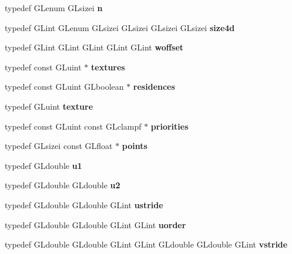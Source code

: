 \begin{DoxyCompactItemize}
\item 
typedef G\+Lenum G\+Lsizei {\bfseries n}\label{_s_d_l__opengl_8h_a0788d3762d0c3c76e4c094d8078b4c27}

\item 
typedef G\+Lint G\+Lenum G\+Lsizei G\+Lsizei G\+Lsizei G\+Lsizei {\bfseries size4d}\label{_s_d_l__opengl_8h_a3ee638722d778306b1776526a7711d9a}

\item 
typedef G\+Lint G\+Lint G\+Lint G\+Lint G\+Lint {\bfseries woffset}\label{_s_d_l__opengl_8h_ad57a355b89bd6780d0797d5a72d15514}

\item 
typedef const G\+Luint $\ast$ {\bfseries textures}\label{_s_d_l__opengl_8h_a450062c0770127a605331b58382bfa3b}

\item 
typedef const G\+Luint G\+Lboolean $\ast$ {\bfseries residences}\label{_s_d_l__opengl_8h_a1b73b6faf5e03196654860a3c89c8265}

\item 
typedef G\+Luint {\bfseries texture}\label{_s_d_l__opengl_8h_a8f486379aef534669f4f06f515e7ce6c}

\item 
typedef const G\+Luint const G\+Lclampf $\ast$ {\bfseries priorities}\label{_s_d_l__opengl_8h_ab2d88f127452baef8666791f74e9a794}

\item 
typedef G\+Lsizei const G\+Lfloat $\ast$ {\bfseries points}\label{_s_d_l__opengl_8h_ae75d9f560170dfeaadc8718c87f5fbec}

\item 
typedef G\+Ldouble {\bfseries u1}\label{_s_d_l__opengl_8h_ab296853c9d55bfdc62cda6c50d1b4781}

\item 
typedef G\+Ldouble G\+Ldouble {\bfseries u2}\label{_s_d_l__opengl_8h_a1c6bf6fa786a04b729b30e56d68474ef}

\item 
typedef G\+Ldouble G\+Ldouble G\+Lint {\bfseries ustride}\label{_s_d_l__opengl_8h_a9fb9363e7d23824a7603a288729cf1ec}

\item 
typedef G\+Ldouble G\+Ldouble G\+Lint G\+Lint {\bfseries uorder}\label{_s_d_l__opengl_8h_a5aee3b53fbc52dbf6e3b023bc594653c}

\item 
typedef G\+Ldouble G\+Ldouble G\+Lint G\+Lint G\+Ldouble G\+Ldouble G\+Lint {\bfseries vstride}\label{_s_d_l__opengl_8h_a60703cfb6ea898d8d2bb036ef4c6b2d1}


\end{DoxyCompactItemize}
